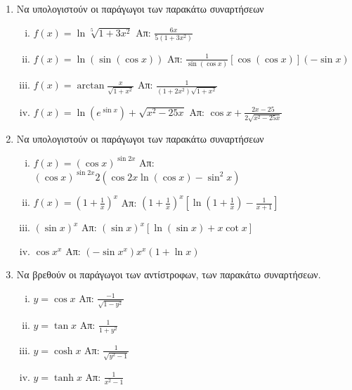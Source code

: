 



\pagestyle{askhseis}



\begin{center}
\end{center}

\vspace{\baselineskip}

\begin{enumerate}


	\item Να υπολογιστούν οι παράγωγοι των παρακάτω συναρτήσεων
		\begin{enumerate}[(i)]
			\item $ f(x) = \ln{\sqrt[5]{1+3x^{2}}} $ \hfill Απ: $
				\frac{6x}{5(1+3x^{2})} $
			\item $ f(x) = \ln({\sin({\cos{x}})}) $ \hfill Απ: $
				\frac{1}{\sin{(\cos{x})}} [\cos{(\cos{x})}] (- \sin{x}) $ 
			\item $ f(x) = \arctan \frac{x}{\sqrt{1 + x^{2}}} $ \hfill Απ: $
			\frac{1}{(1+2x^{2})\sqrt{1 + x^{2}}} $
			\item $ f(x) = \ln{(e^{\sin{x}})} + \sqrt{x^{2} - 25x} $ \hfill Απ: $
				\cos{x} + \frac{2x - 25}{2 \sqrt{x^{2} - 25x}}  $  
		\end{enumerate}

	\item  Να υπολογιστούν οι παράγωγοι των παρακάτω συναρτήσεων

	\begin{enumerate}[(i)]
		\item $ f(x) = (\cos{x})^{\sin{2x}} $ \hfill Απ: $
			(\cos{x})^{\sin{2x}} 2(\cos{2x} \ln{(\cos{x})} - \sin^{2}{x}) $
			\item $ f(x) = \left(1 + \frac{1}{x} \right)^{x} $ \hfill Απ: $
				\left(1 + \frac{1}{x}\right)^{x}\left[\ln{(1 + \frac{1}{x})} -
				\frac{1}{x+1}\right] $
			\item $ (\sin{x})^{x} $ \hfill Απ: $ (\sin{x})^{x}[\ln{(\sin{x}
				)} + x \cot{x}] $ 
			\item $ \cos{x}^{x} $ \hfill Απ: $ (- \sin{x^{x}})x^{x} (1 +
				\ln{x}) $
	\end{enumerate}

	\item Να βρεθούν οι παράγωγοι των αντίστροφων, των παρακάτω συναρτήσεων.
		\begin{enumerate}[(i)]
			\item $ y = \cos{x} $ \hfill Απ: $ \frac{-1}{\sqrt{1 - y^{2}}} $
			\item $ y = \tan{x} $ \hfill Απ: $ \frac{1}{1 + y^{2}} $
			\item $ y = \cosh{x} $  \hfill Απ: $ \frac{1}{\sqrt{y^{2} - 1}} $
			\item $ y = \tanh{x} $ \hfill Απ: $ \frac{1}{x^{2} - 1} $
		\end{enumerate}


\end{enumerate}
